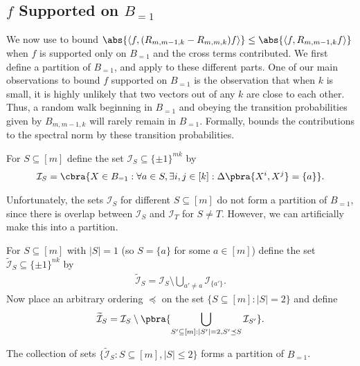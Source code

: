 \subsection{$f$ Supported on $B_{=1}$}\label{sec:B=1}

We now use  to bound $\abs{\left\langle f, (R_{m,m-1,k}-R_{m,m,k})f\right\rangle}\leq \abs{\left\langle f, R_{m,m-1,k}f\right\rangle}$ when $f$ is supported only on $B_{= 1}$ and the cross terms contributed. We first define a partition of $B_{=1}$, and apply  to these different parts. One of our main observations to bound $f$ supported on $B_{=1}$ is the observation that when $k$ is small, it is highly unlikely that two vectors out of any $k$ are close to each other. Thus, a random walk beginning in $B_{=1}$ and obeying the transition probabilities given by $B_{m,m-1,k}$ will rarely remain in $B_{=1}$. Formally,  bounds the contributions to the spectral norm by these transition probabilities.
\begin{definition}
    For $S\subseteq[m]$ define the set $\mathcal{I}_S\subseteq\{\pm1\}^{mk}$ by
    \begin{align*}
        \mathcal{I}_S=\cbra{X\in B_{=1}: \forall a\in S ,\exists i,j\in[k]:\Delta\pbra{X^i,X^j}=\{a\}}.
    \end{align*}
\end{definition}
Unfortunately, the sets $\mathcal{I}_S$ for different $S\subseteq[m]$ do not form a partition of $B_{=1}$, since there is overlap between $\mathcal{I}_S$ and $\mathcal{I}_T$ for $S\neq T$. However, we can artificially make this into a partition.
\begin{definition}
    For $S\subseteq[m]$ with $|S|=1$ (so $S=\{a\}$ for some $a\in[m]$) define the set $\widetilde{\mathcal{I}}_S\subseteq\{\pm1\}^{nk}$ by
    \begin{align*}
        \widetilde{\mathcal{I}}_S=\mathcal{I}_S\setminus \bigcup_{a'\neq a}\mathcal{I}_{\{a'\}}.
    \end{align*}
    Now place an arbitrary ordering $\preceq $ on the set $\{S\subseteq[m]:|S|=2\}$ and define
    \begin{align*}
        \widetilde{\mathcal{I}}_S = \mathcal{I}_S\setminus \pbra{ \bigcup_{S'\subseteq [m]:|S'| = 2,S'\preceq S}\mathcal{I}_{S'}}.
    \end{align*}
\end{definition}

\begin{observation}\label{obs:Is partition}
    The collection of sets $\{\widetilde{\mathcal{I}}_S:S\subseteq[m],|S|\leq 2\}$ forms a partition of $B_{=1}$.
\end{observation}

